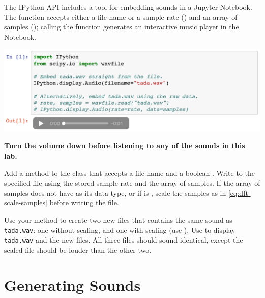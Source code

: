 \begin{info} %
The IPython API includes a tool for embedding sounds in a Jupyter Notebook.
The function  accepts either a file name or a sample rate () and an array of samples (); calling the function generates an interactive music player in the Notebook.
\begin{center}
\includegraphics[width=\textwidth]{figures/notebook_audio.pdf}
\end{center}
\end{info}

\begin{warn}
\textbf{Turn the volume down before listening to any of the sounds in this lab.}
\end{warn}

\begin{problem} %
Add a method to the  class that accepts a file name and a boolean .
Write to the specified file using the stored sample rate and the array of samples.
If the array of samples does not have  as its data type, or if  is , scale the samples as in \eqref{eq:dft-scale-samples} before writing the file.

Use your method to create two new files that contains the same sound as \texttt{tada.wav}: one without scaling, and one with scaling (use ).
Use  to display \texttt{tada.wav} and the new files.
All three files should sound identical, except the scaled file should be louder than the other two.
\end{problem}

\section*{Generating Sounds} %

